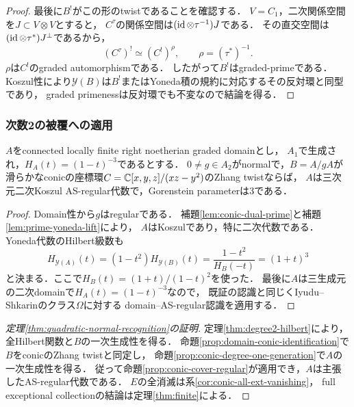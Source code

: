 \documentclass[11pt,a4paper]{ltjsarticle}
\begin{document}
\begin{proof}
最後に$B^!$がこの形のtwistであることを確認する．
$V=C_1$，二次関係空間を$J\subset V\otimes V$とすると，
$C^\tau$の関係空間は$(\operatorname{id}\otimes\tau^{-1})J$である．
その直交空間は$(\operatorname{id}\otimes\tau^*)J^\perp$であるから，
\[
 (C^\tau)^!\simeq(C^!)^\rho,
 \qquad \rho=(\tau^*)^{-1}.
\]
$\rho$は$C^!$のgraded automorphismである．
したがって$B^!$はgraded-primeである．
Koszul性により$\mathcal Y(B)$は$B^!$またはYoneda積の規約に対応するその反対環と同型であり，
graded primenessは反対環でも不変なので結論を得る．
\end{proof}

\subsubsection{次数2の被覆への適用}

\begin{proposition}[一次生成されたconic被覆の認識]
\label{prop:conic-cover-regular}
$A$をconnected locally finite right noetherian graded domainとし，
$A_1$で生成され，$H_A(t)=(1-t)^{-3}$であるとする．
$0\ne g\in A_2$がnormalで，$B=A/gA$が
滑らかなconicの座標環$C=\mathbb C[x,y,z]/(xz-y^2)$のZhang twistならば，
$A$は三次元二次Koszul AS-regular代数で，Gorenstein parameterは$3$である．
\end{proposition}

\begin{proof}
Domain性から$g$はregularである．
補題\ref{lem:conic-dual-prime}と補題\ref{lem:prime-yoneda-lift}により，
$A$はKoszulであり，特に二次代数である．
Yoneda代数のHilbert級数も
\[
 H_{\mathcal Y(A)}(t)
 =(1-t^2)H_{\mathcal Y(B)}(t)
 =\frac{1-t^2}{H_B(-t)}
 =(1+t)^3
\]
と決まる．ここで$H_B(t)=(1+t)/(1-t)^2$を使った．
最後に$A$は三生成元の二次domainで$H_A(t)=(1-t)^{-3}$なので，
既証の認識と同じくIyudu--Shkarin\cite[\S12.1, p.~78]{IS}のクラス$\Omega$に対する
domain--AS-regular認識を適用する．
\end{proof}



\begin{proof}[定理\ref{thm:quadratic-normal-recognition}の証明]
定理\ref{thm:degree2-hilbert}により，全Hilbert関数と$B$の一次生成性を得る．
命題\ref{prop:domain-conic-identification}で$B$をconicのZhang twistと同定し，
命題\ref{prop:conic-degree-one-generation}で$A$の一次生成性を得る．
従って命題\ref{prop:conic-cover-regular}が適用でき，$A$は主張したAS-regular代数である．
$E$の全消滅は系\ref{cor:conic-all-ext-vanishing}，
full exceptional collectionの結論は定理\ref{thm:finite}による．
\end{proof}
\end{document}
